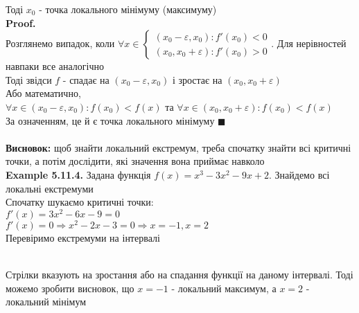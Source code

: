 \documentclass[a4paper, 14pt]{extarticle}
\def\bigline{\vspace{5mm}\\}
\def\ex#1{\textbf{Example {#1}}}
\def\proof{\textbf{Proof.}\\}
\def\bigline{\vspace{5mm}\\}
\def\qed{$\blacksquare$}
\begin{document}
Тоді $x_0$ - точка локального мінімуму (максимуму)\\
\proof
Розглянемо випадок, коли $\forall x \in \begin{cases} (x_0-\varepsilon,x_0): f'(x_0) < 0 \\ (x_0,x_0+\varepsilon): f'(x_0) > 0 \end{cases}$. Для нерівностей навпаки все аналогічно\\
Тоді звідси $f$ - спадає на $(x_0 - \varepsilon, x_0)$ і зростає на $(x_0, x_0 + \varepsilon)$\\
Або математично, \\ $\forall x \in (x_0-\varepsilon, x_0): f(x_0) < f(x)$ та $\forall x \in (x_0, x_0+\varepsilon): f(x_0) < f(x)$\\
За означенням, це й є точка локального мінімуму \qed
\bigline
\\
\textbf{Висновок:} щоб знайти локальний екстремум, треба спочатку знайти всі критичні точки, а потім дослідити, які значення вона приймає навколо
\bigline
\ex{5.11.4.} Задана функція $f(x) = x^3-3x^2-9x+2$. Знайдемо всі локальні екстремуми\\
Спочатку шукаємо критичні точки:\\
$f'(x) = 3x^2-6x-9 = 0$\\
$f'(x) = 0 \Rightarrow x^2-2x-3 = 0 \Rightarrow x = -1,x = 2$\\
Перевіримо екстремуми на інтервалі
\bigline
{}
\\
Стрілки вказують на зростання або на спадання функції на даному інтервалі. Тоді можемо зробити висновок, що $x=-1$ - локальний максимум, а $x=2$ - локальний мінімум
\bigline
\end{document}
